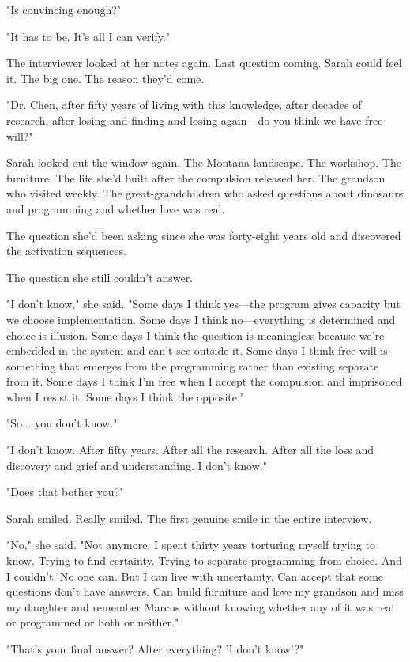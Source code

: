 "Is convincing enough?"

"It has to be. It's all I can verify."

The interviewer looked at her notes again. Last question coming. Sarah could feel it. The big one. The reason they'd come.

"Dr. Chen, after fifty years of living with this knowledge, after decades of research, after losing and finding and losing again—do you think we have free will?"

Sarah looked out the window again. The Montana landscape. The workshop. The furniture. The life she'd built after the compulsion released her. The grandson who visited weekly. The great-grandchildren who asked questions about dinosaurs and programming and whether love was real.

The question she'd been asking since she was forty-eight years old and discovered the activation sequences.

The question she still couldn't answer.

"I don't know," she said. "Some days I think yes—the program gives capacity but we choose implementation. Some days I think no—everything is determined and choice is illusion. Some days I think the question is meaningless because we're embedded in the system and can't see outside it. Some days I think free will is something that emerges from the programming rather than existing separate from it. Some days I think I'm free when I accept the compulsion and imprisoned when I resist it. Some days I think the opposite."

"So... you don't know."

"I don't know. After fifty years. After all the research. After all the loss and discovery and grief and understanding. I don't know."

"Does that bother you?"

Sarah smiled. Really smiled. The first genuine smile in the entire interview.

"No," she said. "Not anymore. I spent thirty years torturing myself trying to know. Trying to find certainty. Trying to separate programming from choice. And I couldn't. No one can. But I can live with uncertainty. Can accept that some questions don't have answers. Can build furniture and love my grandson and miss my daughter and remember Marcus without knowing whether any of it was real or programmed or both or neither."

"That's your final answer? After everything? 'I don't know'?"

